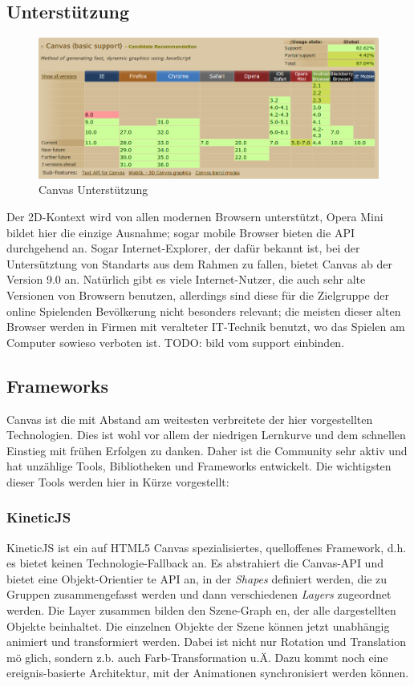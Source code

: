 \documentclass[a4paper, 12pt]{article}
\begin{document}
\subsection{Unterstützung}
\begin{figure}[h!]
	\begin{center}
		\includegraphics[width=\textwidth]{assets/canvas_support.png} 
	\end{center}
	\caption{Canvas Unterstützung}
	\label{canvas_support}
\end{figure}
Der 2D-Kontext wird von allen modernen Browsern unterstützt, Opera Mini bildet hier die einzige Ausnahme; sogar mobile Browser bieten die API durchgehend an. Sogar Internet-Explorer, der dafür bekannt ist, bei der Untersütztung von Standarts aus dem Rahmen zu fallen, bietet Canvas ab der Version 9.0 an. Natürlich gibt es viele Internet-Nutzer, die auch sehr alte Versionen von Browsern benutzen, allerdings sind diese für die Zielgruppe der online Spielenden Bevölkerung nicht besonders relevant; die meisten dieser alten Browser werden in Firmen mit veralteter IT-Technik benutzt, wo das Spielen am Computer sowieso verboten ist.
TODO: bild vom support einbinden.
\subsection{Frameworks}
Canvas ist die mit Abstand am weitesten verbreitete der hier vorgestellten Technologien. Dies ist wohl vor allem der niedrigen Lernkurve und dem schnellen Einstieg mit frühen Erfolgen zu danken. Daher ist die Community sehr aktiv und hat unzählige Tools, Bibliotheken und Frameworks entwickelt. Die wichtigsten dieser Tools werden hier in Kürze vorgestellt:
\subsubsection{KineticJS}
KineticJS ist ein auf HTML5 Canvas spezialisiertes, quelloffenes Framework, d.h. es bietet keinen Technologie-Fallback an. Es abstrahiert die Canvas-API und bietet eine Objekt-Orientier
te API an, in der \emph{Shapes} definiert werden, die zu Gruppen zusammengefasst werden und dann verschiedenen \emph{Layers} zugeordnet werden. Die Layer zusammen bilden den Szene-Graph
en, der alle dargestellten Objekte beinhaltet. Die einzelnen Objekte der Szene können jetzt unabhängig animiert und transformiert werden. Dabei ist nicht nur Rotation und Translation mö
glich, sondern z.b. auch Farb-Transformation u.Ä. Dazu kommt noch eine ereignis-basierte Architektur, mit der Animationen synchronisiert werden können.
\end{document}
